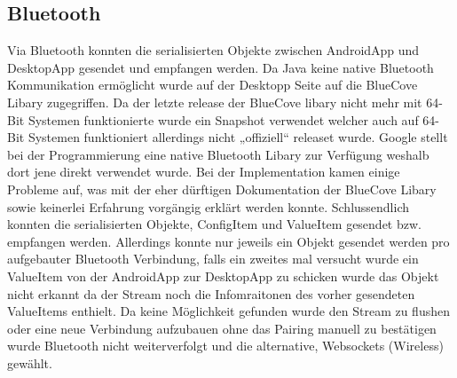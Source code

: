 \subsection{Bluetooth}
Via Bluetooth konnten die serialisierten Objekte zwischen AndroidApp und DesktopApp gesendet und empfangen werden. 
Da Java keine native Bluetooth Kommunikation ermöglicht wurde auf der Desktopp Seite auf die BlueCove Libary zugegriffen. Da der letzte release der BlueCove libary nicht mehr mit 64-Bit Systemen funktionierte wurde ein Snapshot verwendet welcher auch auf 64-Bit Systemen funktioniert allerdings nicht „offiziell“ releaset wurde. Google stellt bei der Programmierung eine native Bluetooth Libary zur Verfügung weshalb dort jene direkt verwendet wurde. 
Bei der Implementation kamen einige Probleme auf, was mit der eher dürftigen Dokumentation der BlueCove Libary sowie keinerlei Erfahrung vorgängig erklärt werden konnte. Schlussendlich konnten die serialisierten Objekte, ConfigItem und ValueItem gesendet bzw. empfangen werden.
Allerdings konnte nur jeweils ein Objekt gesendet werden pro aufgebauter Bluetooth Verbindung, falls ein zweites mal versucht wurde ein ValueItem von der AndroidApp zur DesktopApp zu schicken wurde das Objekt nicht erkannt da der Stream noch die Infomraitonen des vorher gesendeten ValueItems enthielt. Da keine Möglichkeit gefunden wurde den Stream zu flushen oder eine neue Verbindung aufzubauen ohne das Pairing manuell zu bestätigen wurde Bluetooth nicht weiterverfolgt und die alternative, Websockets (Wireless) gewählt. 

            
